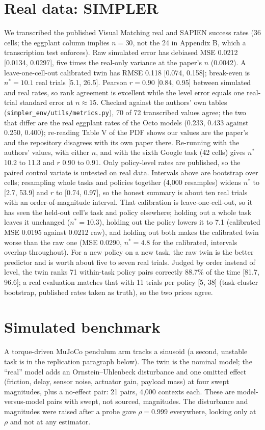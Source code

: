 \documentclass[11pt]{article}
\begin{document}
\section{Real data: SIMPLER}
We transcribed the published Visual Matching real and SAPIEN success rates \cite{li2024simpler} (36 cells; the eggplant column implies $n=30$, not the 24 in Appendix B, which a transcription test enforces). Raw simulated error has debiased MSE 0.0212 [0.0134, 0.0297], five times the real-only variance at the paper's $n$ (0.0042). A leave-one-cell-out calibrated twin has RMSE 0.118 [0.074, 0.158]; break-even is $n^*=10.1$ real trials [5.1, 26.5]. Pearson $r=0.90$ [0.84, 0.95] between simulated and real rates, so rank agreement is excellent while the level error equals one real-trial standard error at $n\approx15$. Checked against the authors' own tables (\texttt{simpler\_env/utils/metrics.py}), 70 of 72 transcribed values agree; the two that differ are the real eggplant rates of the Octo models (0.233, 0.433 against 0.250, 0.400); re-reading Table V of the PDF shows our values are the paper's and the repository disagrees with its own paper there. Re-running with the authors' values, with either $n$, and with the sixth Google task (42 cells) gives $n^*$ 10.2 to 11.3 and $r$ 0.90 to 0.91. Only policy-level rates are published, so the paired control variate is untested on real data. Intervals above are bootstrap over cells; resampling whole tasks and policies together (4{,}000 resamples) widens $n^*$ to [2.7, 53.9] and $r$ to [0.74, 0.97], so the honest summary is about ten real trials with an order-of-magnitude interval. That calibration is leave-one-cell-out, so it has seen the held-out cell's task and policy elsewhere; holding out a whole task leaves it unchanged ($n^*=10.3$), holding out the policy lowers it to 7.1 (calibrated MSE 0.0195 against 0.0212 raw), and holding out both makes the calibrated twin worse than the raw one (MSE 0.0290, $n^*=4.8$ for the calibrated, intervals overlap throughout). For a new policy on a new task, the raw twin is the better predictor and is worth about five to seven real trials. Judged by order instead of level, the twin ranks 71 within-task policy pairs correctly 88.7\% of the time [81.7, 96.6]; a real evaluation matches that with 11 trials per policy [5, 38] (task-cluster bootstrap, published rates taken as truth), so the two prices agree.

\section{Simulated benchmark}
A torque-driven MuJoCo pendulum arm tracks a sinusoid (a second, unstable task is in the replication paragraph below). The twin is the nominal model; the ``real'' model adds an Ornstein--Uhlenbeck disturbance and one omitted effect (friction, delay, sensor noise, actuator gain, payload mass) at four swept magnitudes, plus a no-effect pair: 21 pairs, 4{,}000 contexts each. These are model-versus-model pairs with swept, not sourced, magnitudes. The disturbance and magnitudes were raised after a probe gave $\rho=0.999$ everywhere, looking only at $\rho$ and not at any estimator.
\end{document}

